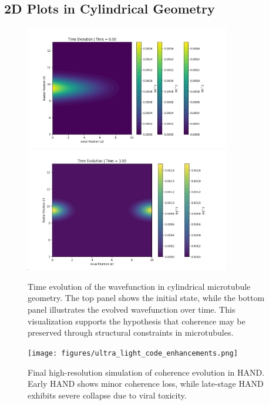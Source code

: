 \documentclass[entropy,article,submit,oneauthor,pdftex]{Definitions/mdpi}
\begin{document}
\subsection{2D Plots in Cylindrical Geometry}
\begin{figure}[H]
    \centering
    \includegraphics[width=0.8\textwidth]{figures/cylindrical_evo0.png}
    \includegraphics[width=0.8\textwidth]{figures/cylindrical_evo3.png}
    \caption{Time evolution of the wavefunction in cylindrical microtubule geometry. The top panel shows the initial state, while the bottom panel illustrates the evolved wavefunction over time. This visualization supports the hypothesis that coherence may be preserved through structural constraints in microtubules.}
    \label{fig:cylindrical_geometry}
\end{figure}
\FloatBarrier  %

\begin{figure}[H]
    \centering
    \texttt{[image: figures/ultra\_light\_code\_enhancements.png]}
    \caption{Final high-resolution simulation of coherence evolution in HAND. Early HAND shows minor coherence loss, while late-stage HAND exhibits severe collapse due to viral toxicity.} \label{fig:HIV_coherence_evolution_final}
\end{figure}
\end{document}
